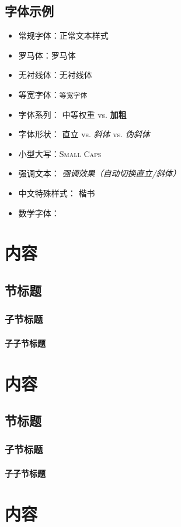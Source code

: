 \documentclass[
    12pt, 
    a4paper,
    scheme=chinese, 
    oneside, 
    openany,   %
    fontset=none, 
    sub3section,
    linespread = 1.389
    ]{ctexbook}
\begin{document}
\section{字体示例}
\begin{itemize}
    \item 常规字体：正常文本样式
    \item 罗马体：\textrm{罗马体}
    \item 无衬线体：\textsf{无衬线体}
    \item 等宽字体：\texttt{等宽字体}
    
    \item 字体系列：
    \textmd{中等权重} vs. \textbf{加粗}
    
    \item 字体形状：
    \textup{直立} vs. \textit{斜体} vs. \textsl{伪斜体}
    
    \item 小型大写：\textsc{Small Caps}
    
    \item 强调文本：
    \emph{强调效果（自动切换直立/斜体）}
    
    \item 中文特殊样式：
    {\kaishu 楷书}      
    
    \item 数学字体：
\end{itemize}
\chapter{内容}
\zhlipsum[1,8]
\zhlipsum[1]
\section{节标题}
\zhlipsum[1]
\subsection{子节标题}
\zhlipsum[1]
\subsubsection{子子节标题}
\zhlipsum[1,8]
\zhlipsum[1,8]
\chapter{内容}
\zhlipsum[1]
\section{节标题}
\zhlipsum[1]
\subsection{子节标题}
\zhlipsum[1]
\subsubsection{子子节标题}
\zhlipsum[1,8]
\chapter{内容}
\zhlipsum[1,8]
\end{document}
